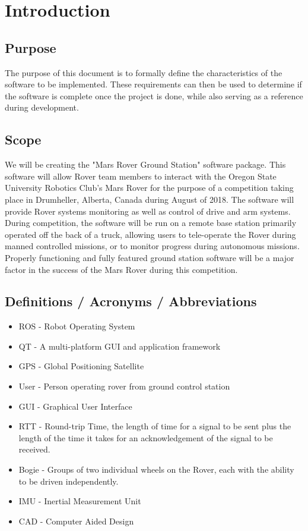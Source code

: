 \documentclass[onecolumn, draftclsnofoot, 10pt, compsoc]{IEEEtran}
\begin{document}
\section{Introduction}
\subsection{Purpose}
The purpose of this document is to formally define the characteristics of the software to be implemented. 
These requirements can then be used to determine if the software is complete once the project is done, while also serving as a reference during development.


\subsection{Scope}
We will be creating the "Mars Rover Ground Station" software package. 
This software will allow Rover team members to interact with the Oregon State University Robotics Club's Mars Rover for the purpose of a competition taking place in Drumheller, Alberta, Canada during August of 2018. 
The software will provide Rover systems monitoring as well as control of drive and arm systems. 
During competition, the software will be run on a remote base station primarily operated off the back of a truck, allowing users to tele-operate the Rover during manned controlled missions, or to monitor progress during autonomous missions. 
Properly functioning and fully featured ground station software will be a major factor in the success of the Mars Rover during this competition.


\subsection{Definitions / Acronyms / Abbreviations}
\begin{itemize}
\item ROS - Robot Operating System
\item QT - A multi-platform GUI and application framework
\item GPS - Global Positioning Satellite 
\item User - Person operating rover from ground control station
\item GUI - Graphical User Interface
\item RTT - Round-trip Time, the length of time for a signal to be sent plus the length of the time it takes for an acknowledgement of the signal to be received.
\item Bogie - Groups of two individual wheels on the Rover, each with the ability to be driven independently.
\item IMU - Inertial Measurement Unit
\item CAD - Computer Aided Design
\end{itemize}
\end{document}
